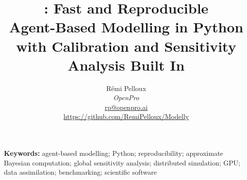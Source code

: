 \documentclass[11pt]{article}
\title{{\LARGE\bfseries \modelly{}: Fast and Reproducible\\[2pt] Agent-Based Modelling in Python}\\[6pt]
{\large with Calibration and Sensitivity Analysis Built In}}
\author{Rémi Pelloux\\
  \small \textit{OpenPro}\\
  \small \href{mailto:rp@openpro.ai}{rp@openpro.ai}\\
  \small \url{https://github.com/RemiPelloux/Modelly}}
\date{}
\begin{document}
\maketitle



\noindent\textbf{Keywords:} agent-based modelling; Python; reproducibility; approximate Bayesian
computation; global sensitivity analysis; distributed simulation; GPU; data assimilation;
benchmarking; scientific software












\renewcommand{\bibfont}{\raggedright}



\clearpage
\appendix

\end{document}
